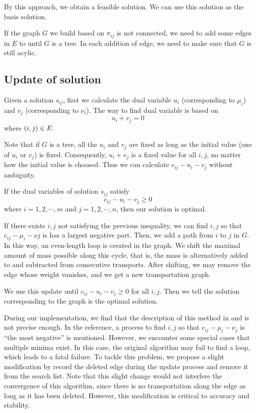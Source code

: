 \documentclass[english]{pkupaper}
\begin{document}
By this approach, we obtain a feasible solution. We can use this solution as the basis solution.

If the graph $G$ we build based on $\pi_{ij}$ is not connected, we need to add some edges in $E$ to until $G$ is a tree. In each addition of edge, we need to make sure that $G$ is still acylic.

\subsection{Update of solution}

Given a solution $s_{ij}$, first we calculate the dual variable $u_i$ (corresponding to $\mu_i$) and $v_j$ (corresponding to $\nu_i$). The way to find dual variable is based on
\begin{equation}
	u_i+v_j=0
\end{equation}
where $ \left(  i, j  \right) \in E $.

Note that if $G$ is a tree, all the $u_i$ and $v_j$ are fixed as long as the initial value (one of $u_i$ or $v_j$) is fixed. Consequently,  $ u_i+v_j$ is a fixed value for all $ i, j $, no matter how the initial value is choosed. Thus we can calculate $c_{ij}-u_i-v_j$ without ambiguity.

If the dual variables of solution $s_{ij}$ satisfy
\begin{equation}
	c_{ij}-u_i-v_j\ge 0
\end{equation}
where $ i = 1, 2, \cdots, m $ and $ j = 1, 2, \cdots, n $, then our solution is optimal.

If there exists $i,j$ not satisfying the previous inequality, we can find $i, j$ so that $c_{ij}-\mu_{i}-\nu{j}$ is has a largest negative part. Then, we add a path from $i$ to $j$ in $G$. In this way, an even-length loop is created in the graph. We shift the maximal amount of mass possible along this cycle, that is, the mass is alternatively added to and subtracted from consecutive transports. After shifting, we may remove the edge whose weight vanishes, and we get a new transportation graph.

We use this update until $c_{ij}-u_i-v_j\ge0$ for all $i,j$. Then we tell the solution corresponding to the graph is the optimal solution.

During our implementation, we find that the description of this method in \parencite{Luenberger2008} and \parencite{Schrieber2017} is not precise enough. In the reference, a process to find $i, j$ so that $c_{ij}-\mu_{i}-\nu_{j}$ is ``the most negative'' is mentioned. However, we encounter some special cases that multiple minima exist. In this case, the original algorithm may fail to find a loop, which leads to a fatal failure. To tackle this problem, we propose a slight modification by record the deleted edge during the update process and remove it from the search list. Note that this slight change would not interfere the convergence of this algorithm, since there is no transportation along the edge as long as it has been deleted. However, this modification is critical to accuracy and stability.
\end{document}
